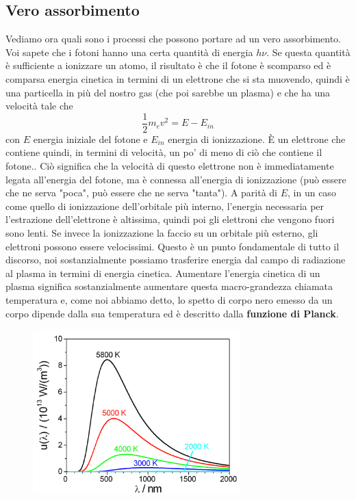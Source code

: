 \documentclass[a4paper,11pt]{article}
\begin{document}
\subsection{Vero assorbimento}
Vediamo ora quali sono i processi che possono portare ad un vero assorbimento. Voi sapete che i fotoni hanno una certa quantità di energia $h\nu$. Se questa quantità è sufficiente a ionizzare un atomo, il risultato è che il fotone è scomparso ed è comparsa energia cinetica in termini di un elettrone che si sta muovendo, quindi è una particella in più del nostro gas (che poi sarebbe un plasma) e che ha una velocità tale che
$$
\frac{1}{2}m_{e}v^{2}=E-E_{in} 
$$
con $E$ energia iniziale del fotone e $E_{in}$ energia di ionizzazione.
\newline
È un elettrone che contiene quindi, in termini di velocità, un po' di meno di ciò che contiene il fotone.. Ciò significa che la velocità di questo elettrone non è immediatamente legata all'energia del fotone, ma è connessa all'energia di ionizzazione (può essere che ne serva "poca", può essere che ne serva "tanta"). A parità di $E$, in un caso come quello di ionizzazione dell'orbitale più interno, l'energia necessaria per l'estrazione dell'elettrone è altissima, quindi poi gli elettroni che vengono fuori sono lenti. Se invece la ionizzazione la faccio su un orbitale più esterno, gli elettroni possono essere velocissimi.
Questo è un punto fondamentale di tutto il discorso, noi sostanzialmente possiamo trasferire energia dal campo di radiazione al plasma in termini di energia cinetica. Aumentare l'energia cinetica di un plasma significa sostanzialmente aumentare questa macro-grandezza chiamata temperatura e, come noi abbiamo detto, lo spetto di corpo nero emesso da un corpo dipende dalla sua temperatura ed è descritto dalla \textbf{funzione di Planck}.
\begin{figure}[h]
    \centering
    \includegraphics[width=8cm]{28-10.4(funzione di Planck).png}
    \label{fig:28-10.4funzione di Planck}
\end{figure}
\end{document}
